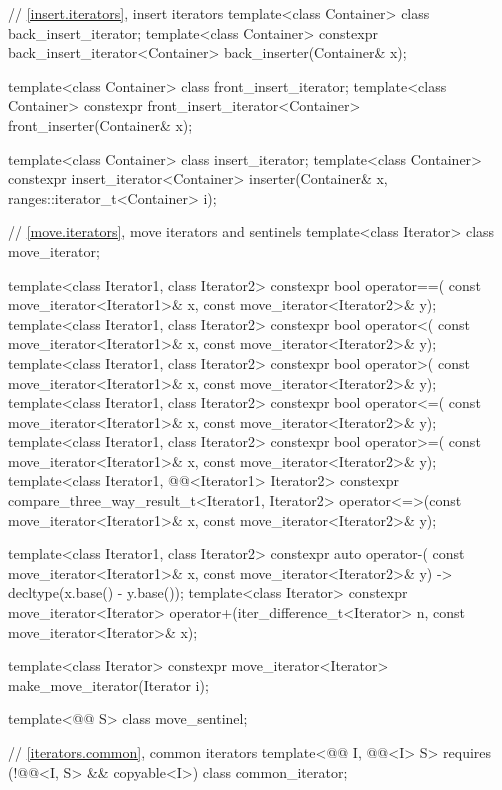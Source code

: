 \begin{codeblock}
{  // \ref{insert.iterators}, insert iterators
  template<class Container> class back_insert_iterator;
  template<class Container>
    constexpr back_insert_iterator<Container> back_inserter(Container& x);

  template<class Container> class front_insert_iterator;
  template<class Container>
    constexpr front_insert_iterator<Container> front_inserter(Container& x);

  template<class Container> class insert_iterator;
  template<class Container>
    constexpr insert_iterator<Container>
      inserter(Container& x, ranges::iterator_t<Container> i);

  // \ref{move.iterators}, move iterators and sentinels
  template<class Iterator> class move_iterator;

  template<class Iterator1, class Iterator2>
    constexpr bool operator==(
      const move_iterator<Iterator1>& x, const move_iterator<Iterator2>& y);
  template<class Iterator1, class Iterator2>
    constexpr bool operator<(
      const move_iterator<Iterator1>& x, const move_iterator<Iterator2>& y);
  template<class Iterator1, class Iterator2>
    constexpr bool operator>(
      const move_iterator<Iterator1>& x, const move_iterator<Iterator2>& y);
  template<class Iterator1, class Iterator2>
    constexpr bool operator<=(
      const move_iterator<Iterator1>& x, const move_iterator<Iterator2>& y);
  template<class Iterator1, class Iterator2>
    constexpr bool operator>=(
      const move_iterator<Iterator1>& x, const move_iterator<Iterator2>& y);
  template<class Iterator1, @@<Iterator1> Iterator2>
    constexpr compare_three_way_result_t<Iterator1, Iterator2>
      operator<=>(const move_iterator<Iterator1>& x,
                  const move_iterator<Iterator2>& y);

  template<class Iterator1, class Iterator2>
    constexpr auto operator-(
      const move_iterator<Iterator1>& x, const move_iterator<Iterator2>& y)
        -> decltype(x.base() - y.base());
  template<class Iterator>
    constexpr move_iterator<Iterator>
      operator+(iter_difference_t<Iterator> n, const move_iterator<Iterator>& x);

  template<class Iterator>
    constexpr move_iterator<Iterator> make_move_iterator(Iterator i);

  template<@@ S> class move_sentinel;

  // \ref{iterators.common}, common iterators
  template<@@ I, @@<I> S>
    requires (!@@<I, S> && copyable<I>)
      class common_iterator;

}
\end{codeblock}
